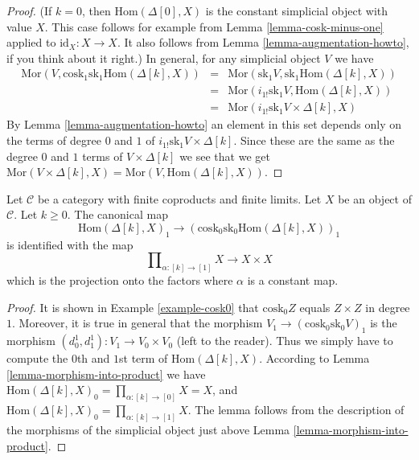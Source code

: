 \begin{proof}
(If $k = 0$, then $\text{Hom}(\Delta[0], X)$
is the constant simplicial object with value $X$.
This case follows for example from Lemma \ref{lemma-cosk-minus-one}
applied to $\text{id}_X : X \to X$. It also follows from
Lemma \ref{lemma-augmentation-howto}, if you think about it right.)
In general, for any simplicial object $V$ we have
\begin{eqnarray*}
\text{Mor}(V, \text{cosk}_1 \text{sk}_1 \text{Hom}(\Delta[k], X))
& = &
\text{Mor}(\text{sk}_1 V, \text{sk}_1 \text{Hom}(\Delta[k], X)) \\
& = &
\text{Mor}(i_{1!} \text{sk}_1 V, \text{Hom}(\Delta[k], X)) \\
& = &
\text{Mor}(i_{1!} \text{sk}_1 V \times \Delta[k], X)
\end{eqnarray*}
By Lemma \ref{lemma-augmentation-howto} an element
in this set depends only on the terms of degree $0$ and $1$
of $i_{1!} \text{sk}_1 V \times \Delta[k]$. Since these
are the same as the degree $0$ and $1$ terms of
$V \times \Delta[k]$ we see that we get
$\text{Mor}(V \times \Delta[k], X) = \text{Mor}(V, \text{Hom}(\Delta[k], X))$.
\end{proof}

\begin{lemma}
\label{lemma-cosk0-hom-deltak}
Let $\mathcal{C}$ be a category with finite coproducts
and finite limits. Let $X$ be an object of $\mathcal{C}$.
Let $k \geq 0$. The canonical map
$$
\text{Hom}(\Delta[k], X)_1
\longrightarrow
(\text{cosk}_0 \text{sk}_0 \text{Hom}(\Delta[k], X))_1
$$
is identified with the map
$$
\prod\nolimits_{\alpha : [k] \to [1]} X
\longrightarrow
X \times X
$$
which is the projection onto the factors where $\alpha$
is a constant map.
\end{lemma}

\begin{proof}
It is shown in Example \ref{example-cosk0} that
$\text{cosk}_0 Z$ equals $Z \times Z$ in degree $1$.
Moreover, it is true in general that the morphism
$V_1 \to (\text{cosk}_0 \text{sk}_0 V)_1$ is
the morphism $(d^1_0, d^1_1) : V_1 \to V_0 \times V_0$
(left to the reader). Thus we simply have to compute
the $0$th and $1$st term of $\text{Hom}(\Delta[k], X)$.
According to Lemma \ref{lemma-morphism-into-product}
we have
$\text{Hom}(\Delta[k], X)_0 = \prod_{\alpha : [k] \to [0]} X = X$,
and $\text{Hom}(\Delta[k], X)_0 = \prod_{\alpha : [k] \to [1]} X$.
The lemma follows from the description of the
morphisms of the simplicial object just above
Lemma  \ref{lemma-morphism-into-product}.
\end{proof}




